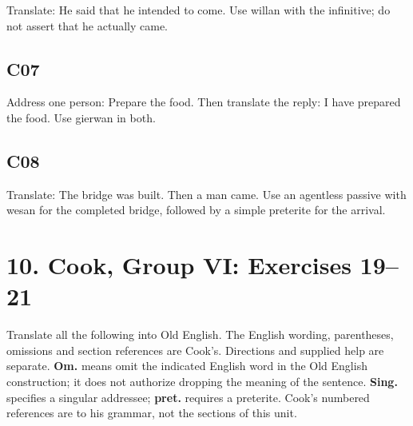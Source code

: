 \par\begin{minipage}{\linewidth}\raggedright
Translate: He said that he intended to come. Use willan with the infinitive; do not assert that he actually came.

\end{minipage}\par\addvspace{4pt}

\subsection*{C07}

\par\begin{minipage}{\linewidth}\raggedright
Address one person: Prepare the food. Then translate the reply: I have prepared the food. Use gierwan in both.

\end{minipage}\par\addvspace{4pt}

\subsection*{C08}

\par\begin{minipage}{\linewidth}\raggedright
Translate: The bridge was built. Then a man came. Use an agentless passive with wesan for the completed bridge, followed by a simple preterite for the arrival.

\end{minipage}\par\addvspace{4pt}

\section*{10. Cook, Group VI: Exercises 19–21}

Translate all the following into Old English. The English wording, parentheses, omissions and section references are Cook’s. Directions and supplied help are separate. \textbf{Om.} means omit the indicated English word in the Old English construction; it does not authorize dropping the meaning of the sentence. \textbf{Sing.} specifies a singular addressee; \textbf{pret.} requires a preterite. Cook’s numbered references are to his grammar, not the sections of this unit.

